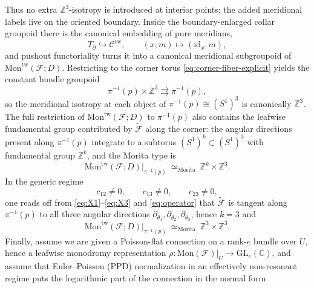 \documentclass[11pt]{amsart}
\theoremstyle{plain}
\theoremstyle{definition}
\newcommand{\Mon}{\mathrm{Mon}}
\theoremstyle{definition}
\begin{document}
Thus no extra $\mathbb{Z}^3$-isotropy is introduced at interior points; the added meridional labels live on the oriented boundary.
Inside the boundary-enlarged collar groupoid there is the canonical embedding of pure meridians,
\begin{equation}\label{eq:meridional-embed}
T_\partial\hookrightarrow \mathcal C^{\mathrm{tw}},
\qquad
(x,m)\longmapsto (\mathrm{id}_x,m),
\end{equation}
and pushout functoriality turns it into a canonical meridional subgroupoid of $\Mon^{\mathrm{tw}}(\mathcal F;D)$. Restricting to the corner torus \eqref{eq:corner-fiber-explicit} yields the constant bundle groupoid
\begin{equation}\label{eq:corner-bundle-groupoid-explicit}
\pi^{-1}(p)\times\mathbb{Z}^3\rightrightarrows \pi^{-1}(p),
\end{equation}
so the meridional isotropy at each object of $\pi^{-1}(p)\cong(S^1)^3$ is canonically $\mathbb{Z}^3$. The full restriction of $\Mon^{\mathrm{tw}}(\mathcal F;D)$ to $\pi^{-1}(p)$ also contains the leafwise fundamental group contributed by $\widetilde{\mathcal F}$ along the corner: the angular directions present along $\pi^{-1}(p)$ integrate to a subtorus $(S^1)^k\subset (S^1)^3$ with fundamental group $\mathbb{Z}^k$, and the Morita type is
\begin{equation}\label{eq:morita-general-explicit}
\Mon^{\mathrm{tw}}(\mathcal F;D)\big|_{\pi^{-1}(p)}\ \simeq_{\mathrm{Morita}}\ \mathbb{Z}^k\times\mathbb{Z}^3.
\end{equation}
In the generic regime
\begin{equation}\label{eq:generic-regime}
c_{12}\neq 0,\qquad c_{13}\neq 0,\qquad c_{23}\neq 0,
\end{equation}
one reads off from \eqref{eq:X1}--\eqref{eq:X3} and \eqref{eq:operator} that $\widetilde{\mathcal F}$ is tangent along $\pi^{-1}(p)$ to all three angular directions $\partial_{\theta_1},\partial_{\theta_2},\partial_{\theta_3}$, hence $k=3$ and
\begin{equation}\label{eq:morita-generic-explicit}
\Mon^{\mathrm{tw}}(\mathcal F;D)\big|_{\pi^{-1}(p)}\ \simeq_{\mathrm{Morita}}\ \mathbb{Z}^3\times\mathbb{Z}^3.
\end{equation}
Finally, assume we are given a Poisson-flat connection on a rank-$e$ bundle over $U$, hence a leafwise monodromy representation $\rho:\Mon(\mathcal F)|_U\to \mathrm{GL}_e(\mathbb{C})$, and assume that Euler--Poisson (PPD) normalization in an effectively non-resonant regime puts the logarithmic part of the connection in the normal form
\end{document}
